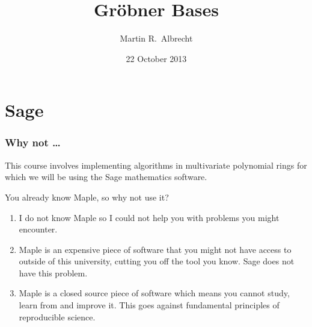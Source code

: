 \documentclass[9pt]{beamer}
\title{Gröbner Bases}
\author[Martin R.\ Albrecht]{Martin R.\ Albrecht}
\institute[] %
{DTU Crypto Group}
\date{22 October 2013}
\begin{document}
\begin{frame}[plain] %
  \titlepage
\end{frame}

\section{Sage}

\begin{frame}
\frametitle{Why not \dots}

This course involves implementing algorithms in multivariate polynomial rings for which we will be using the Sage mathematics software.

\vspace{1em}

You already know Maple, so why not use it?

\begin{enumerate}
 \item I do not know Maple so I could not help you with problems you might encounter.
 \item Maple is an expensive piece of software that you might not have access to outside of this university, cutting you off the tool you know. Sage does not have this problem.
 \item Maple is a closed source piece of software which means you cannot study, learn from and improve it. This goes against fundamental principles of reproducible science.
\end{enumerate}

\end{frame}
\end{document}
